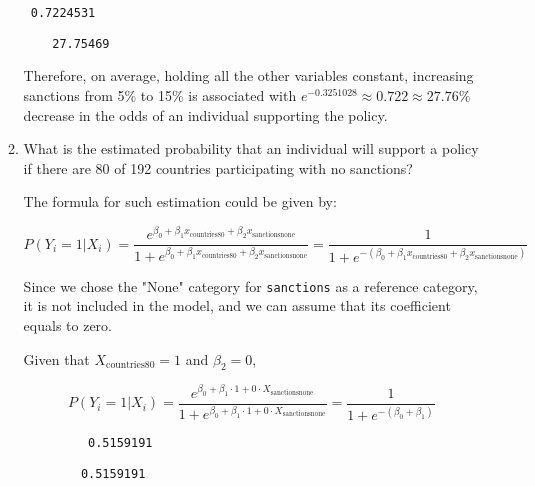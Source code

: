 \documentclass[12pt,letterpaper]{article}
\begin{document}
\begin{enumerate}
\begin{enumerate}
 

\begin{verbatim}
 0.7224531
\end{verbatim}

 

\begin{verbatim}
	27.75469 
\end{verbatim}

Therefore, on average, holding all the other variables constant, increasing sanctions from 5\% to 15\% is associated with \( e^{-0.3251028} \approx 0.722 \approx 27.76\% \) decrease in the odds of an individual supporting the policy.

		\item
		What is the estimated probability that an individual will support a policy if there are 80 of 192 countries participating with no sanctions? \\
	\vspace{.25cm}
	
The formula for such estimation could be given by:
		
\[ P(Y_i = 1|X_i) = \frac{e^{\beta_0 + \beta_1 x_{\text{countries80}} + \beta_2 x_{\text{sanctionsnone}}}}{1 + e^{\beta_0 + \beta_1 x_{\text{countries80}} + \beta_2 x_{\text{sanctionsnone}}}} = \frac{1}{1 + e^{-(\beta_0 + \beta_1 x_{\text{countries80}} + \beta_2 x_{\text{sanctionsnone}})}} \]

Since we chose the "None" category for \texttt{sanctions} as a reference category, it is not included in the model, and we can assume that its coefficient equals to zero. 

Given that \( X_{\text{countries80}} = 1 \) and \( \beta_2 = 0 \),

\[ P(Y_i = 1|X_i) = \frac{e^{\beta_0 + \beta_1 \cdot 1 + 0 \cdot X_{\text{sanctionsnone}}}}{1 + e^{\beta_0 + \beta_1 \cdot 1 + 0 \cdot X_{\text{sanctionsnone}}}} = \frac{1}{1 + e^{-(\beta_0 + \beta_1)}} \]


	 
	\begin{verbatim}
		 0.5159191 
	\end{verbatim}

	 
	
		\begin{verbatim}
		0.5159191 
	\end{verbatim}


\end{enumerate}
\end{enumerate}
\end{document}
